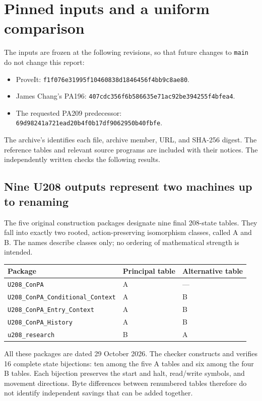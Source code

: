 \clearpage
\section{Pinned inputs and a uniform comparison}\label{sec:comparison}

The inputs are frozen at the following revisions, so that future changes to
\texttt{main} do not change this report:
\begin{itemize}
\item ProveIt: \texttt{f1f076e31995f10460838d1846456f4bb9c8ae80}.
\item James Chang's PA196: \texttt{407cdc356f6b586635e71ac92be394255f4bfea4}.
\item The requested PA209 predecessor:
\texttt{69d98241a721ead20b4f0b17df9062950b40fbfe}.
\end{itemize}
The archive's  identifies each file,
archive member, URL, and SHA-256 digest. The reference tables and relevant
source programs are included with their notices. The independently written
 checks the following results.

\subsection{Nine U208 outputs represent two machines up to renaming}

The five original construction packages designate nine final 208-state
tables. They fall into exactly two rooted, action-preserving isomorphism
classes, called A and B. The names describe classes only; no ordering of
mathematical strength is intended.

\begin{center}\small
\begin{tabular}{@{}lll@{}}
\toprule
Package & Principal table & Alternative table\\
\midrule
\texttt{U208\_ConPA} & A & ---\\
\texttt{U208\_ConPA\_Conditional\_Context} & A & B\\
\texttt{U208\_ConPA\_Entry\_Context} & A & B\\
\texttt{U208\_ConPA\_History} & A & B\\
\texttt{u208\_research} & B & A\\
\bottomrule
\end{tabular}
\end{center}
All these packages are dated 29 October 2026. The checker constructs and
verifies 16 complete state bijections: ten among the five A tables and six
among the four B tables. Each bijection preserves the start and halt,
read/write symbols, and movement directions. Byte differences between
renumbered tables therefore do not identify independent savings that can
be added together.

